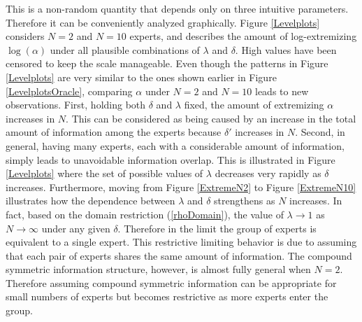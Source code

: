 \documentclass[11pt]{article}
\theoremstyle{definition}
\theoremstyle{definition}
\begin{document}
This is a non-random quantity that depends only on three intuitive parameters. Therefore it can be conveniently analyzed graphically. Figure \ref{Levelplots} considers $N = 2$ and $N = 10$ experts, and describes the amount of log-extremizing $\log(\alpha)$ under all plausible combinations of $\lambda$ and $\delta$. High values have been censored to keep the scale manageable. Even though the patterns in Figure \ref{Levelplots}  are very similar to the ones shown earlier in Figure \ref{LevelplotsOracle}, comparing $\alpha$ under $N = 2$ and $N = 10$ leads to new observations. First, holding both $\delta$ and $\lambda$ fixed, the amount of extremizing $\alpha$ increases in $N$. This can be considered as being caused by an increase in the total amount of information among the experts because $\delta'$ increases in $N$. Second, in general, having many experts, each with a considerable amount of information, simply leads to unavoidable information overlap. This is illustrated in Figure \ref{Levelplots} where the set of possible values of $\lambda$ decreases very rapidly as $\delta$ increases. Furthermore, moving from Figure \ref{ExtremeN2} to Figure \ref{ExtremeN10} illustrates how the dependence between $\lambda$ and $\delta$ strengthens as $N$ increases. In fact, based on the domain restriction (\ref{rhoDomain}), the value of $\lambda \to 1$ as $N \to \infty$ under any given $\delta$. Therefore in the limit the group of experts is equivalent to a single expert. This restrictive limiting behavior is due to assuming that each pair of experts shares the same amount of information. The compound symmetric information structure, however, is almost fully general when $N = 2$. Therefore assuming compound symmetric information can be appropriate for small numbers of experts but becomes restrictive as more experts enter the group. 








\end{document}
